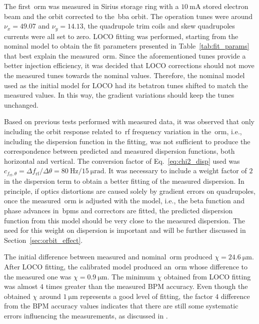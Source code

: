 The first~\gls{orm} was measured in Sirius storage ring with a $\SI{10}{\milli\ampere}$ stored electron beam and the orbit corrected to the~\gls{bba} orbit. The operation tunes were around $\nu_x = 49.07$ and $\nu_y = 14.13$, the quadrupole trim coils and skew quadrupoles currents were all set to zero. LOCO fitting was performed, starting from the nominal model to obtain the fit parameters presented in Table~\ref{tab:fit_params} that best explain the measured~\gls{orm}. Since the aforementioned tunes provide a better injection efficiency, it was decided that LOCO corrections should not move the measured tunes towards the nominal values. Therefore, the nominal model used as the initial model for LOCO had its betatron tunes shifted to match the measured values. In this way, the gradient variations should keep the tunes unchanged.

Based on previous tests performed with measured data, it was observed that only including the orbit response related to~\gls{rf} frequency variation in the~\gls{orm}, i.e., including the dispersion function in the fitting, was not sufficient to produce the correspondence between predicted and measured dispersion functions, both horizontal and vertical. The conversion factor of Eq.~\eqref{eq:chi2_disp} used was $c_{f_{\mathrm{rf}}, \theta} = \Delta f_{\mathrm{rf}}/\Delta \theta = \SI{80}{\hertz}/\SI{15}{\micro\radian}$. It was necessary to include a weight factor of $2$ in the dispersion term to obtain a better fitting of the measured dispersion. In principle, if optics distortions are caused solely by gradient errors on quadrupoles, once the measured~\gls{orm} is adjusted with the model, i.e., the beta function and phase advances in~\glspl{bpm} and correctors are fitted, the predicted dispersion function from this model should be very close to the measured dispersion. The need for this weight on dispersion is important and will be further discussed in Section~\ref{sec:orbit_effect}.

The initial difference between measured and nominal~\gls{orm} produced $\chi = \SI{24.6}{\micro\meter}$. After LOCO fitting, the calibrated model produced an~\gls{orm} whose difference to the measured one was $\chi = \SI{0.9}{\micro\meter}$. The minimum $\chi$ obtained from LOCO fitting was almost $4$ times greater than the measured BPM accuracy. Even though the obtained $\chi$ around $\SI{1}{\micro\meter}$ represents a good level of fitting, the factor $4$ difference from the BPM accuracy values indicates that there are still some systematic errors influencing the measurements, as discussed in \cite{safranek1997}.

